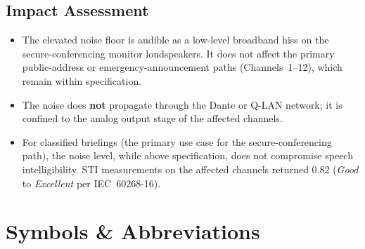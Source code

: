 \documentclass[11pt,letterpaper]{article}
\begin{document}
\subsection{Impact Assessment}

\begin{itemize}[leftmargin=*, nosep, before=\vspace{4pt}, after=\vspace{0pt}]
  \item The elevated noise floor is audible as a low-level broadband hiss on the
        secure-conferencing monitor loudspeakers. It does not affect the primary
        public-address or emergency-announcement paths (Channels~1--12), which
        remain within specification.
  \item The noise does \textbf{not} propagate through the Dante or Q-LAN
        network; it is confined to the analog output stage of the affected
        channels.
  \item For classified briefings (the primary use case for the secure-conferencing
        path), the noise level, while above specification, does not compromise
        speech intelligibility. STI measurements on the affected channels returned
        $0.82$ (\textit{Good} to \textit{Excellent} per IEC~60268-16).
\end{itemize}

\section{Symbols \& Abbreviations}
\end{document}
